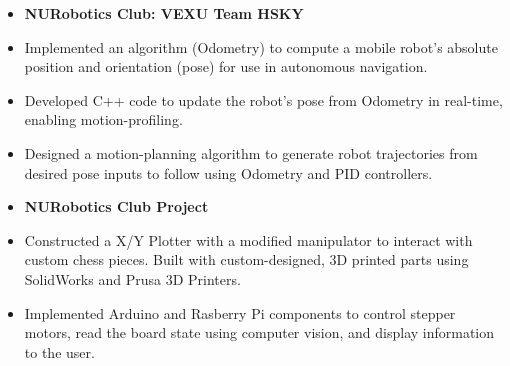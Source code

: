 \documentclass[10pt,a4paper,ragged2e,withhyper]{altacv}
\begin{document}
\begin{paracol}{2}
    \vspace{-2em}
    \begin{itemize}
        \item[] \textbf{NURobotics Club: VEXU Team HSKY}
        \item Implemented an algorithm (Odometry) to compute a mobile robot's absolute position and orientation (pose) for use in autonomous navigation.
        \item Developed C++ code to update the robot's pose from Odometry in real-time, enabling motion-profiling.
        \item Designed a motion-planning algorithm to generate robot trajectories from desired pose inputs to follow using Odometry and PID controllers.
    \end{itemize}
    \begin{itemize}
        \item[] \textbf{NURobotics Club Project}
        \item Constructed a X/Y Plotter with a modified manipulator to interact with custom chess pieces. Built with custom-designed, 3D printed parts using SolidWorks and Prusa 3D Printers.
        \item Implemented Arduino and Rasberry Pi components to control stepper motors, read the board state using computer vision, and display information to the user.
    \end{itemize}

\end{paracol}
\end{document}
